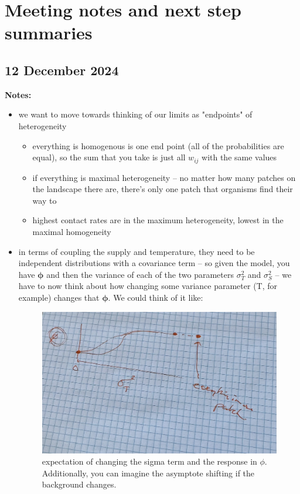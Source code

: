 \documentclass[11pt]{article}
\begin{document}
\section{Meeting notes and next step summaries}
\subsection{12 December 2024}

\textbf{Notes:}
\begin{itemize}
    \item we want to move towards thinking of our limits as "endpoints" of heterogeneity 
    \begin{itemize}
        \item everything is homogenous is one end point (all of the probabilities are equal), so the sum that you take is just all $w_{ij}$ with the same values 
        \item if everything is maximal heterogeneity -- no matter how many patches on the landscape there are, there's only one patch that organisms find their way to 
        \item highest contact rates are in the maximum heterogeneity, lowest in the maximal homogeneity
    \end{itemize}
    \item in terms of coupling the supply and temperature, they need to be independent distributions with a covariance term -- so given the model, you have $\mathbf{\phi}$ and then the variance of each of the two parameters $\sigma^2_T$ and $\sigma^2_S$ -- we have to now think about how changing some variance parameter (T, for example) changes that $\mathbf{\phi}$. We could think of it like: 

\begin{figure}[!hpt]
    \centering
    \includegraphics[width=0.65\linewidth]{man/notes-figs/phi-sigma-t.jpg}
    \caption{expectation of changing the sigma term and the response in $\phi$. Additionally, you can imagine the asymptote shifting if the background changes.}
    \label{}
\end{figure}


\end{itemize}
\end{document}
